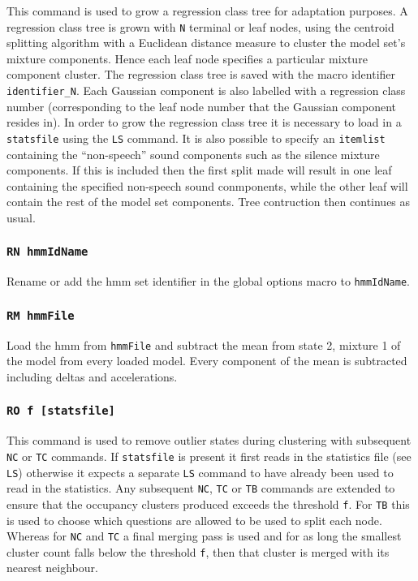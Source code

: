 This command is used to grow a regression class tree for adaptation
purposes. A regression class tree is grown with
\texttt{N} terminal or leaf nodes, using the centroid splitting algorithm
with a Euclidean distance measure to cluster the model set's mixture
components. Hence each leaf node specifies a particular mixture
component cluster. The regression class tree is saved with the macro
identifier \texttt{identifier\_N}. Each Gaussian component is also
labelled with a regression class number (corresponding to the leaf
node number that the Gaussian component resides in). In order to grow
the regression class tree it is necessary to load in a \texttt{statsfile}
using the \texttt{LS} command. It is also possible to specify an
\texttt{itemlist} containing the ``non-speech'' sound components 
such as the silence mixture components. If this is included then the
first split made will result in one leaf containing the specified
non-speech sound conmponents, while the other leaf will contain the
rest of the model set components. Tree contruction then continues as usual.

\subsubsection*{\tt RN hmmIdName}

Rename or add the hmm set identifier in the global options macro to 
{\tt hmmIdName}.

\subsubsection*{\tt RM hmmFile}

Load the hmm from \texttt{hmmFile} and subtract the mean from state 2,
mixture 1 of the model from every loaded model.  Every component
of the mean is subtracted including deltas and accelerations.

\subsubsection*{\tt RO f [statsfile]}

This command is used to remove outlier states during clustering
with subsequent \texttt{NC} or \texttt{TC} commands.
If \texttt{statsfile} is present it first reads in the  statistics 
file (see \texttt{LS}) otherwise it expects a separate \texttt{LS} command
to have already been used to read in the statistics.
Any subsequent \texttt{NC}, \texttt{TC} or \texttt{TB} commands are
extended to ensure that the occupancy clusters produced exceeds the 
threshold \texttt{f}.
For \texttt{TB} this is used to choose which questions are allowed to
be used to split each node.   Whereas for \texttt{NC} and \texttt{TC} 
a final merging pass is used and for as long the smallest cluster count 
falls below the threshold \texttt{f}, then that cluster is merged with 
its nearest neighbour.

